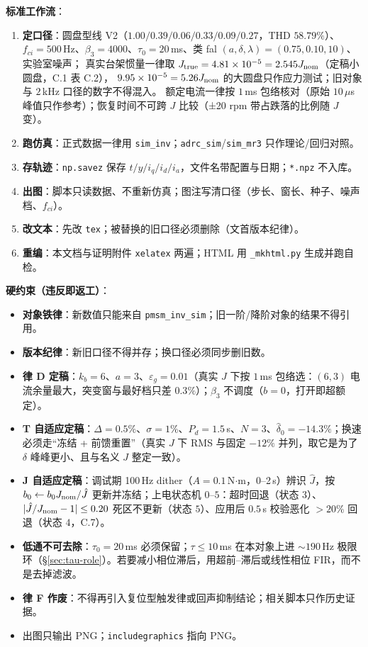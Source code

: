 \documentclass[11pt,a4paper]{article}
\theoremstyle{remark}\newtheorem{remark}{注}
\begin{document}
\noindent\textbf{标准工作流}：
\begin{enumerate}
  \item \textbf{定口径}：圆盘型线 V2（$1.00/0.39/0.06/0.33/0.09/0.27$，THD $58.79\%$）、
        $f_{ci}=500$\,Hz、$\beta_3=4000$、$\tau_0=20$\,ms、类 fal $(a,\delta,\lambda)=(0.75,0.10,10)$、实验室噪声；
        真实台架惯量一律取 $J_{\rm true}=4.81\times10^{-5}=2.545J_{\rm nom}$（定稿小圆盘，C.1 表 C.2），
        $9.95\times10^{-5}=5.26J_{\rm nom}$ 的大圆盘只作应力测试；旧对象与 $2$\,kHz 口径的数字不得混入。
        额定电流一律按 $1$\,ms 包络核对（原始 $10$\,$\mu$s 峰值只作参考）；恢复时间不可跨 $J$ 比较（±20 rpm 带占跌落的比例随 $J$ 变）。
  \item \textbf{跑仿真}：正式数据一律用 \texttt{sim\_inv}；\texttt{adrc\_sim}/\texttt{sim\_mr3} 只作理论/回归对照。
  \item \textbf{存轨迹}：\texttt{np.savez} 保存 $t/y/i_q/i_d/i_a$，文件名带配置与日期；\texttt{*.npz} 不入库。
  \item \textbf{出图}：脚本只读数据、不重新仿真；图注写清口径（步长、窗长、种子、噪声档、$f_{ci}$）。
  \item \textbf{改文本}：先改 \texttt{tex}；被替换的旧口径必须删除（文首版本纪律）。
  \item \textbf{重编}：本文档与证明附件 \texttt{xelatex} 两遍；HTML 用 \texttt{\_mkhtml.py} 生成并跑自检。
\end{enumerate}

\noindent\textbf{硬约束（违反即返工）}：
\begin{itemize}
  \item \textbf{对象铁律}：新数值只能来自 \texttt{pmsm\_inv\_sim}；旧一阶/降阶对象的结果不得引用。
  \item \textbf{版本纪律}：新旧口径不得并存；换口径必须同步删旧数。
  \item \textbf{律 D 定稿}：$k_b=6$、$a=3$、$\varepsilon_g=0.01$（真实 $J$ 下按 $1$\,ms 包络选：$(6,3)$ 电流余量最大，突变窗与最好档只差 $0.3\%$）；$\beta_3$ 不调度（$b=0$，打开即超额定）。
  \item \textbf{T 自适应定稿}：$\Delta=0.5\%$、$\sigma=1\%$、$P_d=1.5$\,s、$N=3$、$\hat\delta_0=-14.3\%$；换速必须走“冻结 + 前馈重置”（真实 $J$ 下 RMS 与固定 $-12\%$ 并列，取它是为了 $\delta$ 峰峰更小、且与名义 $J$ 整定一致）。
  \item \textbf{J 自适应定稿}：调试期 100\,Hz dither（$A=0.1$\,N$\cdot$m，0--2\,s）辨识 $\hat J$，按 $b_0\leftarrow b_0J_{\rm nom}/\hat J$ 更新并冻结；上电状态机 $0$--$5$：超时回退（状态 $3$）、$|\hat J/J_{\rm nom}-1|\le0.20$ 死区不更新（状态 $5$）、应用后 $0.5$\,s 校验恶化 $>20\%$ 回退（状态 $4$，C.7）。
  \item \textbf{低通不可去除}：$\tau_0=20$\,ms 必须保留；$\tau\le10$\,ms 在本对象上进 $\sim190$\,Hz 极限环（§\ref{sec:tau-role}）。若要减小相位滞后，用超前--滞后或线性相位 FIR，而不是去掉滤波。
  \item \textbf{律 F 作废}：不得再引入复位型触发律或回声抑制结论；相关脚本只作历史证据。
  \item 出图只输出 PNG；\texttt{includegraphics} 指向 PNG。
\end{itemize}
\end{document}
